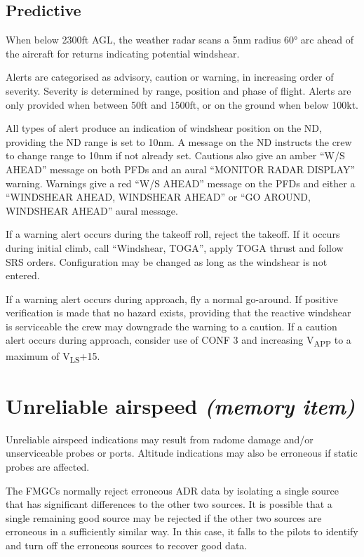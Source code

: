 \documentclass[a5paper,11pt,twoside]{book}
\newcommand{\multicite}[1]{
  \nopagebreak
  \noindent{\footnotesize\color{blue}{[ #1 ]}}
}
\newcommand{\V}[1]{V\textsubscript{#1}}
\begin{document}
\multicite{FCOM PRO.AEP.SURV}

\subsection{Predictive}

When below 2300ft AGL, the weather radar scans a 5nm radius 60° arc ahead of the
aircraft for returns indicating potential windshear.

Alerts are categorised as advisory, caution or warning, in increasing order of
severity. Severity is determined by range, position and phase of flight. Alerts
are only provided when between 50ft and 1500ft, or on the ground when below
100kt.

All types of alert produce an indication of windshear position on the ND,
providing the ND range is set to 10nm. A message on the ND instructs the crew to
change range to 10nm if not already set. Cautions also give an amber “W/S AHEAD”
message on both PFDs and an aural “MONITOR RADAR DISPLAY” warning. Warnings give
a red “W/S AHEAD” message on the PFDs and either a “WINDSHEAR AHEAD, WINDSHEAR
AHEAD” or “GO AROUND, WINDSHEAR AHEAD” aural message.

If a warning alert occurs during the takeoff roll, reject the takeoff. If it
occurs during initial climb, call “Windshear, TOGA”, apply TOGA thrust and
follow SRS orders. Configuration may be changed as long as the windshear is not
entered.

If a warning alert occurs during approach, fly a normal go-around. If positive
verification is made that no hazard exists, providing that the reactive
windshear is serviceable the crew may downgrade the warning to a caution. If a
caution alert occurs during approach, consider use of CONF 3 and increasing
\V{APP} to a maximum of \V{LS}+15.

\multicite{FCOM PRO.AES.SURV}

\section{Unreliable airspeed \emph{(memory item)}}

Unreliable airspeed indications may result from radome damage and/or
unserviceable probes or ports. Altitude indications may also be erroneous if
static probes are affected.

The FMGCs normally reject erroneous ADR data by isolating a single source that
has significant differences to the other two sources. It is possible that a
single remaining good source may be rejected if the other two sources are
erroneous in a sufficiently similar way. In this case, it falls to the pilots to
identify and turn off the erroneous sources to recover good data.
\end{document}
